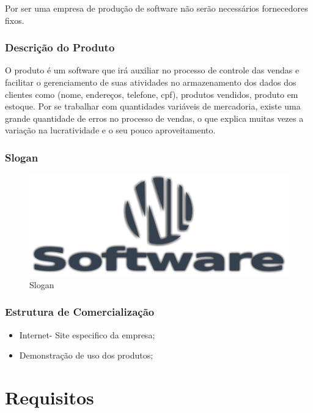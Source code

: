 \documentclass[chapter=TITLE,12pt,oneside,a4paper,english,french,sumario=tradicional,spanish,brazil,]{abntex2}
\begin{document}
Por ser uma empresa de produção de software não serão necessários fornecedores fixos.

\subsection{Descrição do Produto}
O produto é um software que irá auxiliar no processo de controle das vendas e facilitar o gerenciamento de suas atividades no armazenamento dos dados dos clientes como (nome, endereços, telefone, cpf), produtos vendidos, produto em estoque. Por se trabalhar com quantidades variáveis de mercadoria, existe uma grande quantidade de erros no processo de vendas, o que explica muitas vezes a variação na lucratividade e o seu pouco aproveitamento.

\subsection{Slogan}
\begin{figure}[!htpb]\centering
	\includegraphics[scale=0.8]{logo.pdf}\caption{Slogan\label{uc}}
\end{figure}


\subsection{Estrutura de Comercialização}
\begin{itemize}
\item Internet- Site especifico da empresa;
\item Demonstração de uso dos produtos;
\end{itemize}


\chapter{Requisitos}
\end{document}
